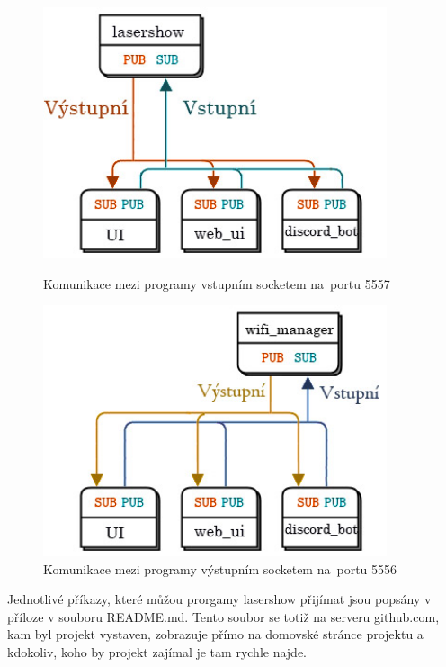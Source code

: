 \begin{figure}[htb]
  \centering
  \begin{minipage}{0.45\textwidth}
    \centering
    \includegraphics[width=0.9\textwidth]{img/comms_lasershow_scheme.jpg}
    \caption{\label{fig:lasershow_comms} Komunikace mezi programy vstupním socketem na~portu 5557}
  \end{minipage}\hfill
  \begin{minipage}{0.45\textwidth}
    \centering
    \includegraphics[width=0.9\textwidth]{img/comms_wifiman_scheme.jpg}
    \caption{\label{fig:wifiman_comms} Komunikace mezi programy výstupním socketem na~portu 5556}
  \end{minipage}
\end{figure}

Jednotlivé příkazy, které můžou prorgamy lasershow přijímat jsou popsány v příloze v souboru README.md. Tento soubor se totiž na serveru github.com, kam byl projekt vystaven, zobrazuje přímo na domovské stránce projektu a kdokoliv, koho by projekt zajímal je tam rychle najde.
